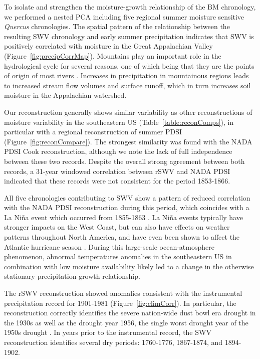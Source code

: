 To isolate and strengthen the moisture-growth relationship of the BM
chronology, we performed a nested PCA including five regional summer
moisture sensitive \textit{Quercus} chronologies. The spatial pattern of
the relationship between the resulting SWV chronology and early summer
precipitation indicates that SWV is positively
correlated with moisture in the Great Appalachian Valley (Figure~\ref{fig:precipCorrMap}). Mountains
play an important role in the hydrological cycle for several reasons,
one of which being that they are the points of origin of most rivers
\cite{beniston1997climatic}. Increases in precipitation in mountainous
regions leads to increased stream flow volumes and surface runoff,
which in turn increases soil moisture in the Appalachian watershed.

Our reconstruction generally shows similar variability as other
reconstructions of moisture variability in the southeastern US
(Table~\ref{table:reconComps}), in particular with a regional
reconstruction of summer PDSI (Figure~\ref{fig:reconCompare}). The
strongest similarity was found with the NADA PDSI Cook reconstruction,
although we note the lack of full independence between these two
records. Despite the overall strong agreement between both records,
a 31-year windowed correlation between rSWV and NADA PDSI indicated that
these records were not consistent for the period 1853-1866.

All five chronologies contributing to SWV show a pattern of reduced
correlation with the NADA PDSI reconstruction during this period,
which coincides with a La Ni\~{n}a event which occurred from
1855-1863 \cite{cole2002multiyear}. La Ni\~{n}a events typically have
stronger impacts on the West Coast, but can also have effects on weather
patterns throughout North America, and have even been shown to affect the
Atlantic hurricane season \cite{pielke1999nina}. During this large-scale
ocean-atmosphere phenomenon, abnormal temperatures anomalies in the
southeastern US \cite{ENSOclimate} in combination with low moisture availability likely led
to a change in the otherwise stationary precipitation-growth relationship.

The rSWV reconstruction showed anomalies consistent with the instrumental
precipitation record for 1901-1981 (Figure~\ref{fig:climCorr}). In particular,
the reconstruction correctly identifies the severe nation-wide dust bowl
era drought in the 1930s as well as the drought year 1956, the single
worst drought year of the 1950s drought \cite{fye2003paleoclimatic}. In
years prior to the instrumental record, the SWV reconstruction identifies
several dry periods: 1760-1776, 1867-1874, and 1894-1902.


